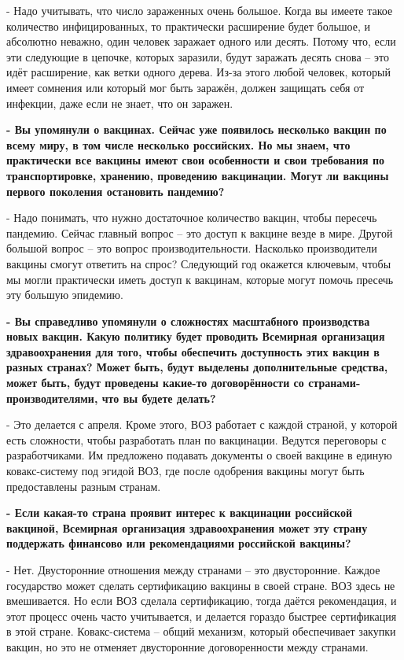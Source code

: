 - Надо учитывать, что число зараженных очень большое. Когда вы имеете такое количество инфицированных, то практически расширение будет большое, и абсолютно неважно, один человек заражает одного или десять. Потому что, если эти следующие в цепочке, которых заразили, будут заражать десять снова – это идёт расширение, как ветки одного дерева. Из-за этого любой человек, который имеет сомнения или который мог быть заражён, должен защищать себя от инфекции, даже если не знает, что он заражен.

\textbf{- Вы упомянули о вакцинах. Сейчас уже появилось несколько вакцин по
всему миру, в том числе несколько российских. Но мы знаем, что практически все
вакцины имеют свои особенности и свои требования по транспортировке, хранению,
проведению вакцинации. Могут ли вакцины первого поколения остановить пандемию?}

- Надо понимать, что нужно достаточное количество вакцин, чтобы пересечь
пандемию. Сейчас главный вопрос – это доступ к вакцине везде в мире. Другой
большой вопрос – это вопрос производительности. Насколько производители вакцины
смогут ответить на спрос? Следующий год окажется ключевым, чтобы мы могли
практически иметь доступ к вакцинам, которые могут помочь пресечь эту большую
эпидемию.

\textbf{- Вы справедливо упомянули о сложностях масштабного производства новых вакцин.
Какую политику будет проводить Всемирная организация здравоохранения для того,
чтобы обеспечить доступность этих вакцин в разных странах? Может быть, будут
выделены дополнительные средства, может быть, будут проведены какие-то
договорённости со странами-производителями, что вы будете делать?}

- Это делается с апреля. Кроме этого, ВОЗ работает с каждой страной, у которой
есть сложности, чтобы разработать план по вакцинации. Ведутся переговоры с
разработчиками. Им предложено подавать документы о своей вакцине в единую
ковакс-систему под эгидой ВОЗ, где после одобрения вакцины могут быть
предоставлены разным странам.

\textbf{- Если какая-то страна проявит интерес к вакцинации российской вакциной,
Всемирная организация здравоохранения может эту страну поддержать финансово или
рекомендациями российской вакцины?}

- Нет. Двусторонние отношения между странами – это двусторонние. Каждое
государство может сделать сертификацию вакцины в своей стране. ВОЗ здесь не
вмешивается. Но если ВОЗ сделала сертификацию, тогда даётся рекомендация, и
этот процесс очень часто учитывается, и делается гораздо быстрее сертификация в
этой стране. Ковакс-система – общий механизм, который обеспечивает закупки
вакцин, но это не отменяет двусторонние договоренности между странами.

